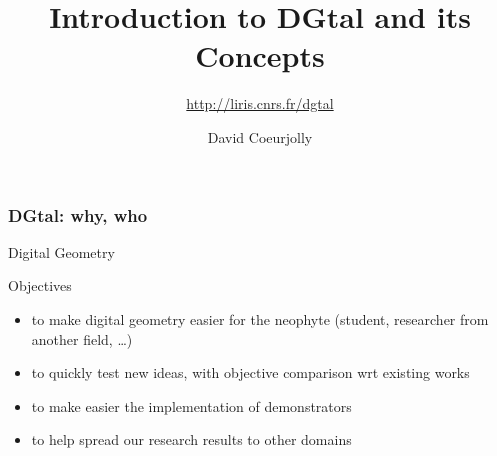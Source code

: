 \documentclass[8pt]{beamer}
\title[IPOL 2012 Meeting on Image Processing Libraries]{Introduction to  DGtal and its Concepts}
\subtitle{\url{http://liris.cnrs.fr/dgtal}}
\author[D. Coeurjolly]{David Coeurjolly}
\begin{document}
\small






\begin{frame}[plain]
  \titlepage
\end{frame}

\begin{frame}%
  \frametitle{DGtal: why, who}
    \begin{alertblock}{} 
    \centering \large \alert{Digital Geometry}
  \end{alertblock}
  
\begin{block}{Objectives}
    \small
    \begin{itemize}
    \item to make digital geometry easier for the neophyte (student,
      researcher from another field, \ldots)
    \item to quickly test  new ideas, with objective comparison wrt
      existing works
    \item to make easier the implementation of demonstrators
    \item to help spread our research results to other domains
    \end{itemize}
  \end{block}
  
\end{frame}
\end{document}
